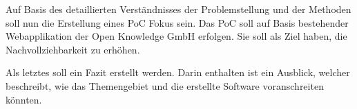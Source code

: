 Auf Basis des detaillierten Verständnisses der Problemstellung und der Methoden soll nun die Erstellung eines PoC Fokus sein. Das PoC soll auf Basis bestehender Webapplikation der Open Knowledge GmbH erfolgen. Sie soll als Ziel haben, die Nachvollziehbarkeit zu erhöhen.

Als letztes soll ein Fazit erstellt werden. Darin enthalten ist ein Ausblick, welcher beschreibt, wie das Themengebiet und die erstellte Software voranschreiten könnten.







